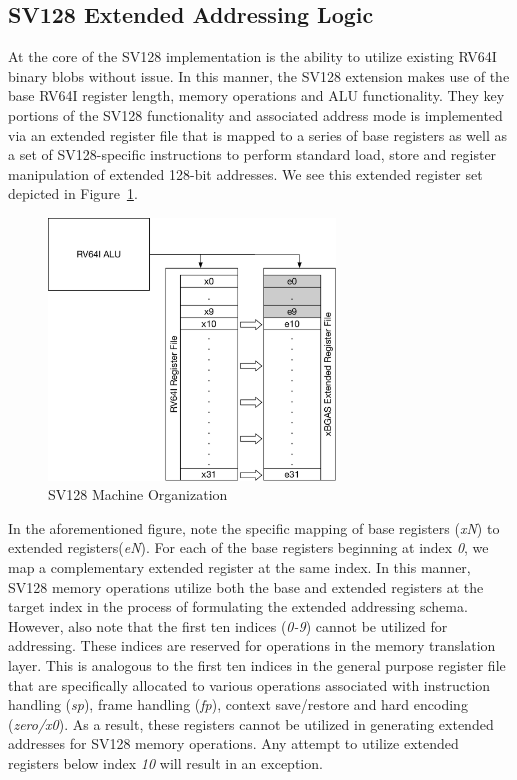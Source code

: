 \documentclass{article}
\begin{document}
\subsection{SV128 Extended Addressing Logic}

At the core of the SV128 implementation is the ability to utilize existing RV64I 
binary blobs without issue.  In this manner, the SV128 extension makes use 
of the base RV64I register length, memory operations and ALU functionality.  
They key portions of the SV128 functionality and associated address mode 
is implemented via an extended register file that is mapped to a series 
of base registers as well as a set of SV128-specific instructions to perform 
standard load, store and register manipulation of extended 128-bit addresses.  We 
see this extended register set depicted in Figure~\ref{fig:machineorganization}.  

\begin{figure}[h!]
\begin{center}
\includegraphics[width=3in]{figures/rv128imachorg.pdf}
\caption{SV128 Machine Organization}
\label{fig:machineorganization}
\end{center}
\end{figure}

In the aforementioned figure, note the specific mapping of base registers 
(\textit{xN}) to extended registers(\textit{eN}).  For each of the base 
registers beginning at index \textit{0}, we map a complementary extended 
register at the same index.  In this manner, SV128 memory operations 
utilize both the base and extended registers at the target index in the process 
of formulating the extended addressing schema.  However, also note that 
the first ten indices (\textit{0-9}) cannot be utilized for addressing.  These 
indices are reserved for operations in the memory translation layer.  This is 
analogous to the first ten indices in the general purpose register file 
that are specifically allocated to various operations associated with instruction 
handling (\textit{sp}), frame handling (\textit{fp}), context save/restore 
and hard encoding (\textit{zero/x0}).  As a result, these registers cannot be 
utilized in generating extended addresses for SV128 memory operations.  
Any attempt to utilize extended registers below index \textit{10} will 
result in an exception.    
\end{document}
